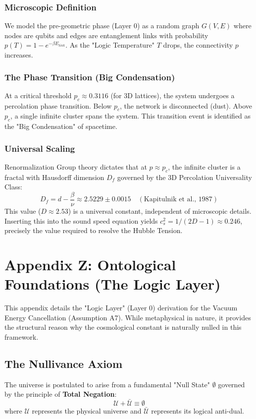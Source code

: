 \documentclass[a4paper,12pt]{article}
\begin{document}
\subsubsection{Microscopic Definition}
We model the pre-geometric phase (Layer 0) as a random graph $G(V, E)$ where nodes are qubits and edges are entanglement links with probability $p(T) = 1 - e^{-\beta E_{link}}$.
As the "Logic Temperature" $T$ drops, the connectivity $p$ increases.

\subsubsection{The Phase Transition (Big Condensation)}
At a critical threshold $p_c \approx 0.3116$ (for 3D lattices), the system undergoes a percolation phase transition. Below $p_c$, the network is disconnected (dust). Above $p_c$, a single infinite cluster spans the system. This transition event is identified as the "Big Condensation" of spacetime.

\subsubsection{Universal Scaling}
Renormalization Group theory dictates that at $p \approx p_c$, the infinite cluster is a fractal with Hausdorff dimension $D_f$ governed by the 3D Percolation Universality Class:
\begin{equation}
    D_f = d - \frac{\beta}{\nu} \approx 2.5229 \pm 0.0015 \quad (\text{Kapitulnik et al., 1987})
\end{equation}
This value ($D \approx 2.53$) is a universal constant, independent of microscopic details. Inserting this into the sound speed equation yields $c_s^2 = 1/(2D-1) \approx 0.246$, precisely the value required to resolve the Hubble Tension.

\section{Appendix Z: Ontological Foundations (The Logic Layer)}

This appendix details the "Logic Layer" (Layer 0) derivation for the Vacuum Energy Cancellation (Assumption A7). While metaphysical in nature, it provides the structural reason why the cosmological constant is naturally nulled in this framework.

\subsection{The Nullivance Axiom}
The universe is postulated to arise from a fundamental "Null State" $\emptyset$ governed by the principle of \textbf{Total Negation}:
\begin{equation}
    \mathcal{U} + \bar{\mathcal{U}} \equiv \emptyset
\end{equation}
where $\mathcal{U}$ represents the physical universe and $\bar{\mathcal{U}}$ represents its logical anti-dual. 
\end{document}
